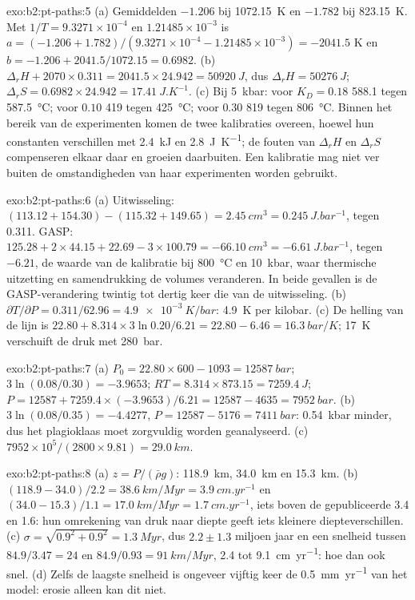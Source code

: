 \begin{solution}{exo:b2:pt-paths:5}
(a) Gemiddelden $-1.206$ bij \qty{1072.15}{K} en $-1.782$ bij \qty{823.15}{K}. Met $1/T =
9.3271\times10^{-4}$ en $1.21485\times10^{-3}$ is $a = (-1.206 + 1.782)/(9.3271\times10^{-4}
- 1.21485\times10^{-3}) = -2041.5$ K en $b = -1.206 + 2041.5/1072.15 = 0.6982$.
(b) $\Delta_r H + 2070\times0.311 = 2041.5\times24.942 = \qty{50920}{J}$, dus $\Delta_r H =
\qty{50276}{J}$; $\Delta_r S = 0.6982\times24.942 = \qty{17.41}{J.K^{-1}}$. (c) Bij
\qty{5}{kbar}: voor $K_D = 0.18$ 588.1 tegen \qty{587.5}{\celsius}; voor $0.10$ 419
tegen \qty{425}{\celsius}; voor $0.30$ 819 tegen \qty{806}{\celsius}. Binnen het bereik
van de experimenten komen de twee kalibraties overeen, hoewel hun constanten verschillen met
\qty{2.4}{kJ} en \qty{2.8}{J.K^{-1}}; de fouten van $\Delta_r H$ en $\Delta_r S$
compenseren elkaar daar en groeien daarbuiten. Een kalibratie mag niet ver
buiten de omstandigheden van haar experimenten worden gebruikt.
\end{solution}

\begin{solution}{exo:b2:pt-paths:6}
(a) Uitwisseling: $(113.12 + 154.30) - (115.32 + 149.65) = \qty{+2.45}{cm^3} =
\qty{0.245}{J.bar^{-1}}$, tegen 0.311. GASP: $125.28 + 2\times44.15 + 22.69 -
3\times100.79 = \qty{-66.10}{cm^3} = \qty{-6.61}{J.bar^{-1}}$, tegen $-6.21$, de waarde
van de kalibratie bij \qty{800}{\celsius} en \qty{10}{kbar}, waar thermische uitzetting en
samendrukking de volumes veranderen. In beide gevallen is de GASP-verandering twintig tot dertig keer
die van de uitwisseling. (b) $\partial T/\partial P = 0.311/62.96 = \qty{4.9e-3}{K/bar}$:
\qty{4.9}{K} per kilobar. (c) De helling van de lijn is $22.80 + 8.314\times3\ln 0.20/6.21
= 22.80 - 6.46 = \qty{16.3}{bar/K}$; \qty{17}{K} verschuift de druk met
\qty{280}{bar}.
\end{solution}

\begin{solution}{exo:b2:pt-paths:7}
(a) $P_0 = 22.80\times600 - 1093 = \qty{12587}{bar}$; $3\ln(0.08/0.30) = -3.9653$; $RT =
8.314\times873.15 = \qty{7259.4}{J}$; $P = 12587 + 7259.4\times(-3.9653)/6.21 = 12587 -
4635 = \qty{7952}{bar}$. (b) $3\ln(0.08/0.35) = -4.4277$, $P = 12587 - 5176 =
\qty{7411}{bar}$: \qty{0.54}{kbar} minder, dus het plagioklaas moet zorgvuldig worden geanalyseerd.
(c) $7952\times10^5/(2800\times9.81) = \qty{29.0}{km}$.
\end{solution}

\begin{solution}{exo:b2:pt-paths:8}
(a) $z = P/(\bar\rho g)$: \qty{118.9}{km}, \qty{34.0}{km} en \qty{15.3}{km}.
(b) $(118.9 - 34.0)/2.2 = \qty{38.6}{km/Myr} = \qty{3.9}{cm.yr^{-1}}$ en $(34.0 -
15.3)/1.1 = \qty{17.0}{km/Myr} = \qty{1.7}{cm.yr^{-1}}$, iets boven de gepubliceerde
3.4 en 1.6: hun omrekening van druk naar diepte geeft iets kleinere
diepteverschillen. (c) $\sigma = \sqrt{0.9^2 + 0.9^2} = \qty{1.3}{Myr}$, dus $2.2 \pm 1.3$
miljoen jaar en een snelheid tussen $84.9/3.47 = 24$ en $84.9/0.93 = \qty{91}{km/Myr}$,
2.4 tot \qty{9.1}{cm.yr^{-1}}: hoe dan ook snel. (d) Zelfs de laagste snelheid is ongeveer vijftig keer
de \qty{0.5}{mm.yr^{-1}} van het model: erosie alleen kan dit niet.
\end{solution}

